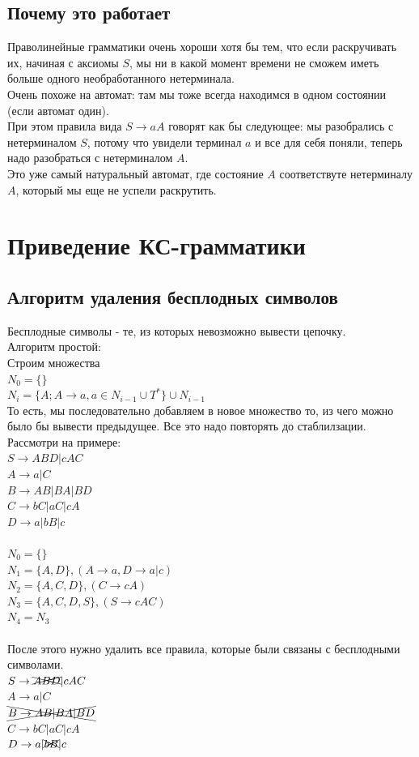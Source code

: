 \documentclass[14pt]{extreport}
\begin{document}
	\section{Почему это работает}
	Праволинейные грамматики очень хороши хотя бы тем, что если раскручивать их, начиная
	с аксиомы $S$, мы ни в какой момент времени не сможем иметь больше одного
	необработанного нетерминала.\\
	Очень похоже на автомат: там мы тоже всегда находимся в одном состоянии (если
	автомат один).\\
	При этом правила вида $S \to aA$ говорят как бы следующее: мы разобрались с нетерминалом
	$S$, потому что увидели терминал $a$ и все для себя поняли, теперь надо 
	разобраться с нетерминалом $A$.\\
	Это уже самый натуральный автомат, где состояние $A$ соответствуте нетерминалу $A$, который
	мы еще не успели раскрутить.
	
	
	\chapter{Приведение КС-грамматики}
	\section{Алгоритм удаления бесплодных символов}
	Бесплодные символы - те, из которых невозможно вывести цепочку.\\
	Алгоритм простой:\\
	Строим множества\\
	$N_0=\{\}$\\
	$N_i=\{A; A \to a, a \in N_{i-1} \cup T^*\} \cup N_{i-1}$\\
	То есть, мы последовательно добавляем в новое множество то, из чего можно было
	бы вывести предыдущее. Все это надо повторять до стаблилзации.\\
	Рассмотри на примере:\\
	$S \to ABD | cAC $\\
	$A \to a | C $\\
	$B \to AB | BA | BD $\\
	$C \to bC | aC | cA $\\
	$D \to a | bB | c$\\\\
	$N_0=\{\}$\\
	$N_1=\{A,D\}, (A \to a, D \to a | c)$\\
	$N_2=\{A,C,D\}, (C \to cA)$\\
	$N_3=\{A,C,D,S\}, (S \to cAC)$\\
	$N_4=N_3$\\\\
	После этого нужно удалить все правила, которые были связаны с бесплодными символами.\\
	$S \to \xcancel{ABD} | cAC $\\
	$A \to a | C $\\
	$\xcancel{B \to AB | BA | BD }$\\
	$C \to bC | aC | cA $\\
	$D \to a | \xcancel{bB} | c$\\\\
\end{document}
